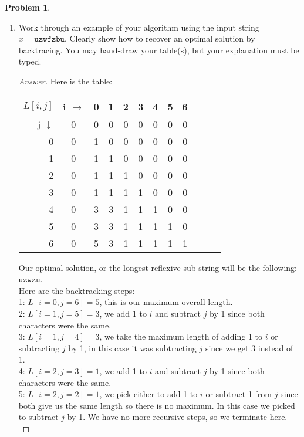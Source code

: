 \documentclass[11pt]{article}
\theoremstyle{definition}
\theoremstyle{definition}
\newtheorem{required}{Problem}
\theoremstyle{definition}
\begin{document}
\begin{required}
\begin{enumerate}[label=(\alph*)]
\newpage
        \subsection{Problem 25\ref{2c} (1 Point)}
\item \label{2c} Work through an example of your algorithm using the input string $x = \texttt{uzwfzbu} $. Clearly show how to recover an optimal solution by backtracing. You may hand-draw your table(s), but your explanation must be typed.

\begin{proof}[Answer]
	Here is the table:\\
\begin{center}
\begin{tabular}{|r|c|c|c|c|c|c|c|c|c|c|c|}
	\hline
	$L[i, j]$& i $\rightarrow$ &0 & 1 & 2 & 3 & 4 & 5 & 6\\ \hline
	j $\downarrow$ & 0 & 0 & 0 & 0 & 0 & 0 & 0 & 0 \\ \hline
	0 & 0 & 1 & 0 & 0 & 0 & 0 & 0 &0 \\ \hline
	1 & 0 & 1 & 1 & 0 & 0 & 0 & 0 &0 \\ \hline
	2 & 0 & 1 & 1 & 1 & 0 & 0 & 0 &0 \\ \hline
	3 & 0 & 1 & 1 & 1 & 1 & 0 & 0 &0\\ \hline
	4 & 0 & 3 & 3 & 1 & 1 & 1 & 0 &0\\ \hline
	5 & 0 & 3 & 3 & 1 & 1 & 1 & 1 &0 \\ \hline
	6 & 0 & 5 & 3 & 1 & 1 & 1 & 1 &1 \\ \hline
\end{tabular}
\end{center}

Our optimal solution, or the longest reflexive sub-string will be the following: $\texttt{uzwzu}$.\\

Here are the backtracking steps:\\
1: $L[i = 0, j = 6] = 5$, this is our maximum overall length.\\
2: $L[i = 1, j = 5] = 3$, we add 1 to $i$ and subtract $j$ by 1 since both characters were the same.\\
3: $L[i = 1, j = 4] = 3$, we take the maximum length of adding 1 to $i$ or subtracting $j$ by 1, in this case it was subtracting $j$ since we get 3 instead of 1.\\
4: $L[i = 2, j = 3] = 1$, we add 1 to $i$ and subtract $j$ by 1 since both characters were the same.\\
5: $L[i = 2, j = 2] = 1$, we pick either to add 1 to $i$ or subtract 1 from $j$ since both give us the same length so there is no maximum. In this case we picked to subtract $j$ by 1. We have no more recursive steps, so we terminate here.\\
\end{proof}
\end{enumerate}
\end{required}

\end{document}

